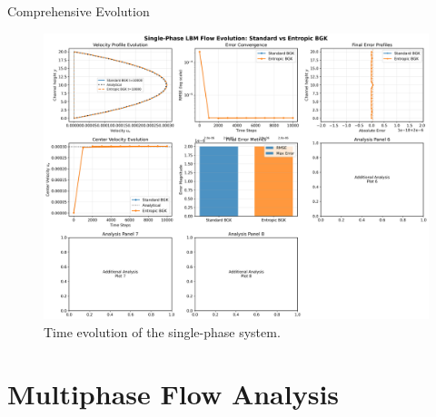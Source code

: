 \documentclass{beamer}
\begin{document}
\begin{frame}{Comprehensive Evolution}
  \begin{figure}
    \includegraphics[width=\textwidth]{plots/single_phase/comprehensive_evolution.png}
    \caption{Time evolution of the single-phase system.}
  \end{figure}
\end{frame}

\section{Multiphase Flow Analysis}
\end{document}
